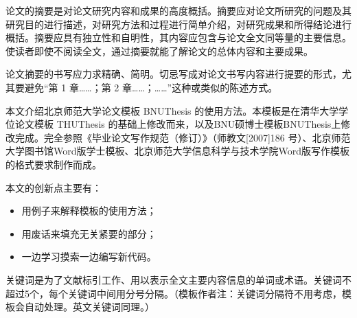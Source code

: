 

\makeatother
{}


\begin{cabstract}
论文的摘要是对论文研究内容和成果的高度概括。摘要应对论文所研究的问题及其研究目的进行描述，对研究方法和过程进行简单介绍，对研究成果和所得结论进行概括。摘要应具有独立性和自明性，其内容应包含与论文全文同等量的主要信息。使读者即使不阅读全文，通过摘要就能了解论文的总体内容和主要成果。

论文摘要的书写应力求精确、简明。切忌写成对论文书写内容进行提要的形式，尤其要避免“第 1 章……；第 2 章……；……”这种或类似的陈述方式。

本文介绍北京师范大学论文模板 BNUThesis 的使用方法。本模板是在清华大学学位论文模板 THUThesis 的基础上修改而来，以及BNU硕博士模板BNUThesis上修改完成。完全参照《毕业论文写作规范（修订）》（师教文[2007]186 号）、北京师范大学图书馆Word版学士模板、北京师范大学信息科学与技术学院Word版写作模板的格式要求制作而成。

  本文的创新点主要有：
  \begin{itemize}[$\bullet$]
    \item 用例子来解释模板的使用方法；
    \item 用废话来填充无关紧要的部分；
    \item 一边学习摸索一边编写新代码。
  \end{itemize}

  关键词是为了文献标引工作、用以表示全文主要内容信息的单词或术语。关键词不超过5个，每个关键词中间用分号分隔。（模板作者注：关键词分隔符不用考虑，模板会自动处理。英文关键词同理。）
\end{cabstract}



